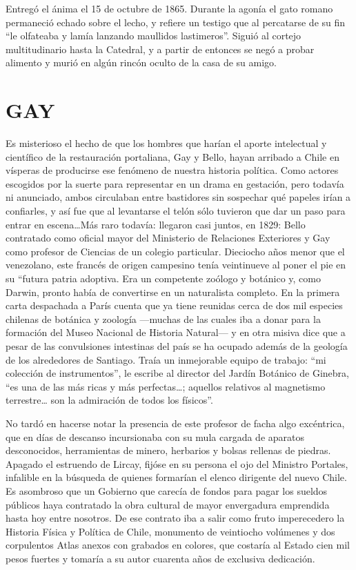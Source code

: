 \documentclass[10pt,twoside,openright]{memoir}
\begin{document}
Entregó el ánima el 15 de octubre de 1865. Durante la agonía el gato
romano permaneció echado sobre el lecho, y refiere un testigo que al
percatarse de su fin ``le olfateaba y lamía lanzando maullidos
lastimeros''. Siguió al cortejo multitudinario hasta la Catedral, y a
partir de entonces se negó a probar alimento y murió en algún rincón
oculto de la casa de su amigo.

\chapter{GAY}

Es misterioso el hecho de que los hombres que harían el aporte
intelectual y científico de la restauración portaliana, Gay y Bello,
hayan arribado a Chile en vísperas de producirse ese fenómeno de nuestra
historia política. Como actores escogidos por la suerte para representar
en un drama en gestación, pero todavía ni anunciado, ambos circulaban
entre bastidores sin sospechar qué papeles irían a confiarles, y así
fue que al levantarse el telón sólo tuvieron que dar un paso para entrar
en escena\ldots Más raro todavía: llegaron casi juntos, en 1829: Bello
contratado como oficial mayor del Ministerio de Relaciones Exteriores y
Gay como profesor de Ciencias de un colegio particular. Dieciocho años
menor que el venezolano, este francés de origen campesino tenía
veintinueve al poner el pie en su ``futura patria adoptiva. Era un
competente zoólogo y botánico y, como Darwin, pronto había de
convertirse en un naturalista completo. En la primera carta despachada a
París cuenta que ya tiene reunidas cerca de dos mil especies chilenas de
botánica y zoología ---muchas de las cuales iba a donar para la
formación del Museo Nacional de Historia Natural--- y en otra misiva
dice que a pesar de las convulsiones intestinas del país se ha ocupado
además de la geología de los alrededores de Santiago. Traía un
inmejorable equipo de trabajo: ``mi colección de instrumentos'', le
escribe al director del Jardín Botánico de Ginebra, ``es una de las más
ricas y más perfectas\ldots; aquellos relativos al magnetismo terrestre\ldots
son la admiración de todos los físicos''.

No tardó en hacerse notar la presencia de este profesor de facha algo
excéntrica, que en días de descanso incursionaba con su mula cargada de
aparatos desconocidos, herramientas de minero, herbarios y bolsas
rellenas de piedras. Apagado el estruendo de Lircay, fijóse en su
persona el ojo del Ministro Portales, infalible en la búsqueda de
quienes formarían el elenco dirigente del nuevo Chile. Es asombroso que
un Gobierno que carecía de fondos para pagar los sueldos públicos haya
contratado la obra cultural de mayor envergadura emprendida hasta hoy
entre nosotros. De ese contrato iba a salir como fruto imperecedero la
Historia Física y Política de Chile, monumento de veintiocho volúmenes y
dos corpulentos Atlas anexos con grabados en colores, que costaría al
Estado cien mil pesos fuertes y tomaría a su autor cuarenta años de
exclusiva dedicación.
\end{document}
